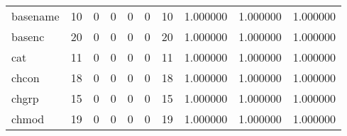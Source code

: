 \begin{tabular}{lrrrrrrrrr}
basename  &                                      10 &                                                  0 &                                                  0 &                                                  0 &                                                  0 &                                                 10 &                                           1.000000 &                               1.000000 &                             1.000000 \\
basenc    &                                      20 &                                                  0 &                                                  0 &                                                  0 &                                                  0 &                                                 20 &                                           1.000000 &                               1.000000 &                             1.000000 \\
cat       &                                      11 &                                                  0 &                                                  0 &                                                  0 &                                                  0 &                                                 11 &                                           1.000000 &                               1.000000 &                             1.000000 \\
chcon     &                                      18 &                                                  0 &                                                  0 &                                                  0 &                                                  0 &                                                 18 &                                           1.000000 &                               1.000000 &                             1.000000 \\
chgrp     &                                      15 &                                                  0 &                                                  0 &                                                  0 &                                                  0 &                                                 15 &                                           1.000000 &                               1.000000 &                             1.000000 \\
chmod     &                                      19 &                                                  0 &                                                  0 &                                                  0 &                                                  0 &                                                 19 &                                           1.000000 &                               1.000000 &                             1.000000 \\

\end{tabular}
